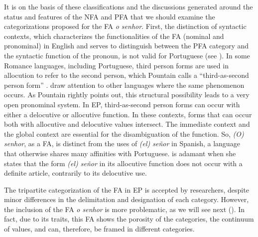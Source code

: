\documentclass[output=paper]{langscibook}
\begin{document}
It is on the basis of these classifications and the discussions generated around the status and features of the NFA and PFA that we should examine the categorizations proposed for the FA \textit{o senhor}. First, the distinction of syntactic contexts, which characterizes the functionalities of the FA (nominal and pronominal) in English and serves to distinguish between the PFA category and the syntactic function of the pronoun, is not valid for Portuguese (see \citealt[376]{Johnen2014}). In some Romance languages, including Portuguese, third person forms are used in allocution to refer to the second person, which Pountain calls a “third-as-second person form” \citep[149–150]{Pountain2003}. \citet{HeineSong2011} draw attention to other languages where the same phenomenon occurs. As Pountain rightly points out, this structural possibility leads to a very open pronominal system. In EP, third-as-second person forms can occur with either a delocutive or allocutive function.  In these contexts, forms that can occur both with allocutive and delocutive values intersect. The immediate context and the global context are essential for the disambiguation of the function. So, \textit{(O) senhor}, as a FA, is distinct from the uses of \textit{(el) señor} in Spanish, a language that otherwise shares many affinities with Portuguese. \citet[264]{CastilloLluch2014} is adamant when she states that the form \textit{(el) señor} in its allocutive function does not occur with a definite article, contrarily to its delocutive use.



The tripartite categorization of the FA in EP is accepted by researchers, despite minor differences in the delimitation and designation of each category. However, the inclusion of the FA \textit{o senhor} is more problematic, as we will see next (). In fact, due to its traits, this FA shows the porosity of the categories, the continuum of values, and can, therefore, be framed in different categories.
\end{document}
